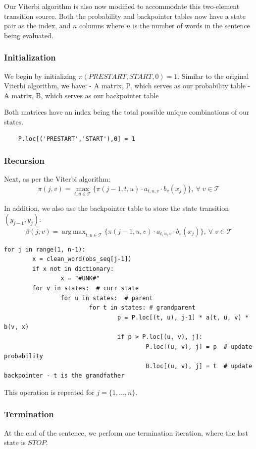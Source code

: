 \documentclass{article}
\DeclareMathOperator*{\argmax}{arg\,max}
\numberwithin{equation}{section}
\begin{document}
Our Viterbi algorithm is also now modified to accommodate this two-element transition source. Both the probability and backpointer tables now have a state pair as the index, and $n$ columns where $n$ is the number of words in the sentence being evaluated.

\subsubsection{Initialization}
We begin by initializing $\pi(PRESTART,START,0) = 1$.
Similar to the original Viterbi algorithm, we have:
- A matrix, P, which serves as our probability table
- A matrix, B, which serves as our backpointer table

Both matrices have an index being the total possible unique combinations of our states.

\begin{verbatim}
	P.loc[('PRESTART','START'),0] = 1
\end{verbatim}

\subsubsection{Recursion}
Next, as per the Viterbi algorithm:
	$$ \pi(j, v) = \max_{t, u\in\mathcal{T}} \{ \pi(j-1, t, u) \cdot a_{t, u, v} \cdot b_v(x_j) \}, \: \forall\; v \in \mathcal{T} $$

In addition, we also use the backpointer table to store the state transition $(y_{j-1}, y_j)$:
	$$\beta(j, v) = \argmax_{t, u\in\mathcal{T}} \{ \pi(j-1, u, v) \cdot a_{t, u, v} \cdot b_v(x_j) \}, \: \forall\; v \in \mathcal{T} $$

\begin{verbatim}
for j in range(1, n-1):
		x = clean_word(obs_seq[j-1])
		if x not in dictionary:
				x = "#UNK#"
		for v in states:  # curr state
				for u in states:  # parent
						for t in states: # grandparent
								p = P.loc[(t, u), j-1] * a(t, u, v) * b(v, x)
								if p > P.loc[(u, v), j]:
										P.loc[(u, v), j] = p  # update probability
										B.loc[(u, v), j] = t  # update backpointer - t is the grandfather
\end{verbatim}

This operation is repeated for $j = \{1, ..., n\}$.

\subsubsection{Termination}
At the end of the sentence, we perform one termination iteration, where the last state is $STOP$.
\end{document}
